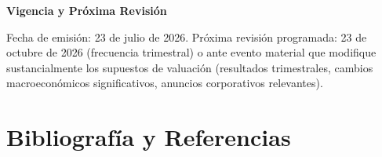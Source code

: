 \documentclass[11pt,a4paper]{article}
\begin{document}
\vspace{0.2cm}
\noindent
\textbf{\color{gsnavy} Vigencia y Próxima Revisión}\\[2pt]
{\small Fecha de emisión: 23 de julio de 2026. Próxima revisión programada: 23 de octubre de 2026 (frecuencia trimestral) o ante evento material que modifique sustancialmente los supuestos de valuación (resultados trimestrales, cambios macroeconómicos significativos, anuncios corporativos relevantes).\par}

\section*{Bibliografía y Referencias}
\end{document}
